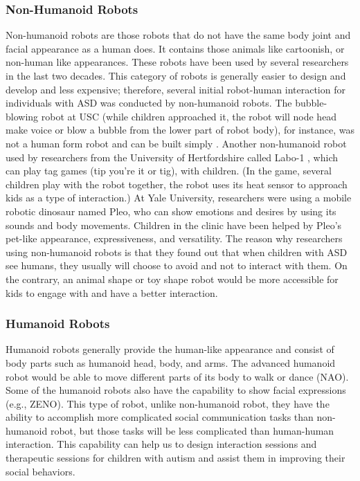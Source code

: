 \subsubsection{Non-Humanoid Robots}
Non-humanoid robots are those robots that do not have the same body joint and facial appearance as 
a human does. It contains those animals like cartoonish, or non-human like appearances. These robots 
have been used by several researchers in the last two decades. This category of robots is generally 
easier to design and develop and less expensive; therefore, several initial robot-human interaction 
for individuals with ASD was conducted by non-humanoid robots. The bubble-blowing robot at USC (while 
children approached it, the robot will node head make voice or blow a bubble from the lower part of robot 
body), for instance, was not a human form robot and can be built simply \cite{feil2008robot}. Another non-humanoid 
robot used by researchers from the University of Hertfordshire called Labo-1 \cite{dautenhahn2004towards}, which can play tag 
games (tip you’re it or tig), with children. (In the game, several children play with the robot 
together, the robot uses its heat sensor to approach kids as a type of interaction.) At Yale University, 
researchers were using a mobile robotic dinosaur named Pleo, who can show emotions and desires by 
using its sounds and body movements. Children in the clinic have been helped by Pleo’s pet-like 
appearance, expressiveness, and versatility. The reason why researchers using non-humanoid robots 
is that they found out that when children with ASD see humans, they usually will choose to avoid 
and not to interact with them. On the contrary, an animal shape or toy shape robot would be more accessible 
for kids to engage with and have a better interaction.\\

\subsubsection{Humanoid Robots}
Humanoid robots generally provide the human-like appearance and consist of body parts such as 
humanoid head, body, and arms. The advanced humanoid robot would be able to move different parts of 
its body to walk or dance (NAO). Some of the humanoid robots also have the capability to show facial 
expressions (e.g., ZENO). This type of robot, unlike non-humanoid robot, they have the ability to 
accomplish more complicated social communication tasks than non-humanoid robot, but those tasks 
will be less complicated than human-human interaction. This capability can help us to design 
interaction sessions and therapeutic sessions for children with autism and assist them in improving 
their social behaviors.\\

